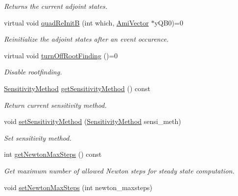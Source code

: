\begin{DoxyCompactItemize}
\begin{DoxyCompactList}\small\item\em Returns the current adjoint states. \end{DoxyCompactList}\item 
virtual void \mbox{\hyperlink{classamici_1_1_solver_ae40c916280416567c031c2a14ad957b3}{quad\+Re\+InitB}} (int which, \mbox{\hyperlink{classamici_1_1_ami_vector}{Ami\+Vector}} $\ast$y\+Q\+B0)=0
\begin{DoxyCompactList}\small\item\em Reinitialize the adjoint states after an event occurence. \end{DoxyCompactList}\item 
\mbox{\label{classamici_1_1_solver_acdf98951e1b488e1ca7c099c2b054939}} 
virtual void \mbox{\hyperlink{classamici_1_1_solver_acdf98951e1b488e1ca7c099c2b054939}{turn\+Off\+Root\+Finding}} ()=0
\begin{DoxyCompactList}\small\item\em Disable rootfinding. \end{DoxyCompactList}\item 
\mbox{\hyperlink{namespaceamici_aa0fa493529f6872e7e776b91fbbf38f9}{Sensitivity\+Method}} \mbox{\hyperlink{classamici_1_1_solver_a888cb7142e103c84bdeeb99566aba65a}{get\+Sensitivity\+Method}} () const
\begin{DoxyCompactList}\small\item\em Return current sensitivity method. \end{DoxyCompactList}\item 
void \mbox{\hyperlink{classamici_1_1_solver_a3a7713f2ce77ffade77445a825ad289d}{set\+Sensitivity\+Method}} (\mbox{\hyperlink{namespaceamici_aa0fa493529f6872e7e776b91fbbf38f9}{Sensitivity\+Method}} sensi\+\_\+meth)
\begin{DoxyCompactList}\small\item\em Set sensitivity method. \end{DoxyCompactList}\item 
int \mbox{\hyperlink{classamici_1_1_solver_ad68589cfe3af35633ff5fa1a4e7aaddb}{get\+Newton\+Max\+Steps}} () const
\begin{DoxyCompactList}\small\item\em Get maximum number of allowed Newton steps for steady state computation. \end{DoxyCompactList}\item 
void \mbox{\hyperlink{classamici_1_1_solver_abf2e868e186c724c8ab939ba261ef314}{set\+Newton\+Max\+Steps}} (int newton\+\_\+maxsteps)

\end{DoxyCompactItemize}
